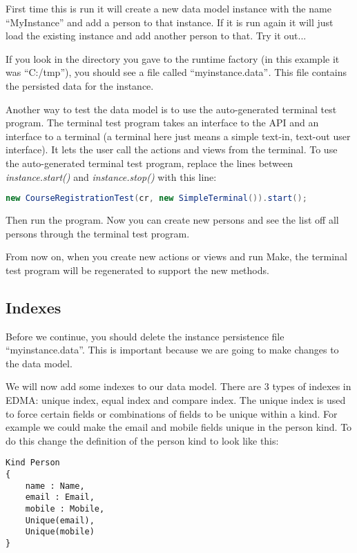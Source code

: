 First time this is run it will create a new data model instance with
the name ``MyInstance'' and add a person to that instance. If it
is run again it will just load the existing instance and add another
person to that. Try it out...

If you look in the directory you gave to the runtime factory (in this
example it was ``C:/tmp''), you should see a file called ``myinstance.data''\emph{.}
This file contains the persisted data for the instance.

Another way to test the data model is to use the auto-generated terminal
test program. The terminal test program takes an interface to the
API and an interface to a terminal (a terminal here just means a simple
text-in, text-out user interface). It lets the user call the actions
and views from the terminal. To use the auto-generated terminal test
program, replace the lines between \emph{instance.start()} and \emph{instance.stop()}
with this line:

\begin{lstlisting}[basicstyle={\scriptsize},language=Java,tabsize=2]
new CourseRegistrationTest(cr, new SimpleTerminal()).start();
\end{lstlisting}


Then run the program. Now you can create new persons and see the list
off all persons through the terminal test program.

From now on, when you create new actions or views and run Make, the
terminal test program will be regenerated to support the new methods.


\subsection{Indexes}

Before we continue, you should delete the instance persistence file
``myinstance.data''. This is important because we are going to make
changes to the data model.

We will now add some indexes to our data model. There are 3 types
of indexes in EDMA: unique index, equal index and compare index. The
unique index is used to force certain fields or combinations of fields
to be unique within a kind. For example we could make the email and
mobile fields unique in the person kind. To do this change the definition
of the person kind to look like this:

\begin{lstlisting}[basicstyle={\scriptsize}]
Kind Person
{
	name : Name,
	email : Email,
	mobile : Mobile,
	Unique(email),
	Unique(mobile)
}
\end{lstlisting}


